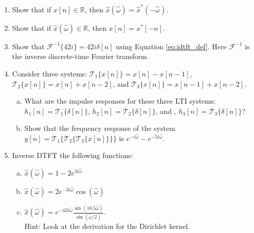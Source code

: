 \begin{enumerate}
  \item Show that if $x[n] \in \mathbb{R}$, then $\hat{x}(\hat{\omega}) = \hat{x}^*(-\hat{\omega})$.

  \item Show that if $\hat{x}(\hat{\omega}) \in \mathbb{R}$, then $x[n]=x^*[-n]$.

  \item Show that $\mathcal{F}^{-1}\{42 i\}=42i\delta[n]$ using Equation \ref{eq:idtft_def}. 
        Here $\mathcal{F}^{-1}$ is the inverse discrete-time Fourier transform.

  \item Consider three systems: $\mathcal{T}_1\{x[n]\} = x[n]-x[n-1]$,  $\mathcal{T}_2\{x[n]\} = x[n]+x[n-2]$, and
        $\mathcal{T}_3\{x[n]\} = x[n-1]+x[n-2]$.
        \begin{enumerate}[a)]
          \item What are the impulse responses for these three LTI systems: $h_1[n]=\mathcal{T}_1\{\delta[n]\}$, $h_2[n]=\mathcal{T}_2\{\delta[n]\}$, and ,  $h_3[n]=\mathcal{T}_3\{\delta[n]\}$?
          \item Show that the frequency response of the system $y[n]=\mathcal{T}_1\{\mathcal{T}_2\{\mathcal{T}_3\{x[n]\}\}\}$ is $e^{-i\hat{\omega}}-e^{-5i\hat{\omega}}$.
        \end{enumerate}

  \item Inverse DTFT the following functions:
        \begin{enumerate}[a)]
          \item $\hat{x}(\hat{\omega})=1-2e^{3i\hat{\omega}}$
          \item $\hat{x}(\hat{\omega})=2e^{-3i\hat{\omega}}\cos(\hat{\omega})$
          \item $\hat{x}(\hat{\omega})=e^{-42i\hat{\omega}} \frac{\sin(10.5 \hat{\omega})}{\sin(\hat{\omega}/2)}$.\\
          Hint: Look at the derivation for the Dirichlet kernel.
        \end{enumerate}

\end{enumerate}

